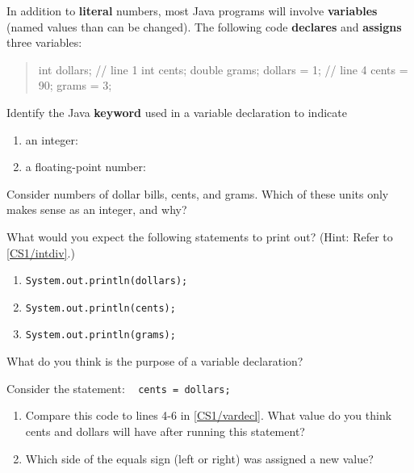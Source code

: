 \label{CS1/vardecl}

In addition to \textbf{literal} numbers, most Java programs will involve \textbf{variables} (named values than can be changed). The following code \textbf{declares} and \textbf{assigns} three variables:

\begin{quote}
\begin{java}
int dollars;        // line 1
int cents;
double grams;
dollars = 1;        // line 4
cents = 90;
grams = 3;
\end{java}
\end{quote}



\Q Identify the Java \textbf{keyword} used in a variable declaration to indicate

\begin{enumerate}
\item an integer: 
\item a floating-point number: 
\end{enumerate}


\Q Consider numbers of dollar bills, cents, and grams. Which of these units only makes sense as an integer, and why?

\begin{answer}
\end{answer}


\Q What would you expect the following statements to print out? (Hint: Refer to \ref{CS1/intdiv}.)

\begin{enumerate}
\item \texttt{System.out.println(dollars);}
\item \texttt{System.out.println(cents);}
\item \texttt{System.out.println(grams);}
\end{enumerate}


\Q What do you think is the purpose of a variable declaration?

\begin{answer}
\end{answer}


\Q Consider the statement: ~ \texttt{cents = dollars;}

\begin{enumerate}
\item Compare this code to lines 4-6 in \ref{CS1/vardecl}.
What value do you think cents and dollars will have after running this statement?

\item Which side of the equals sign (left or right) was assigned a new value?
\end{enumerate}


